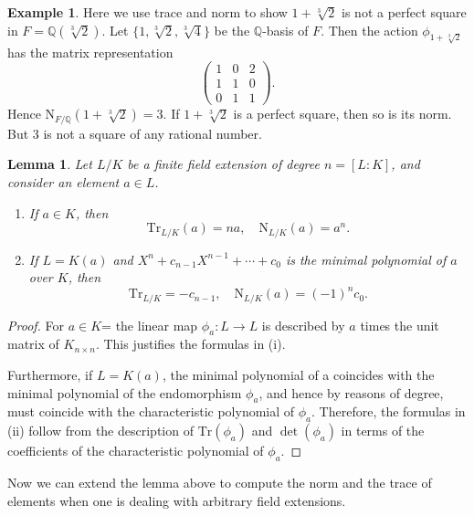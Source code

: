\documentclass[12pt]{report}
\newtheorem{lemma}[theorem]{Lemma}
\theoremstyle{definition}
\newtheorem{example}[theorem]{Example}
\newcommand{\QQ}{\mathbb{Q}}
\newcommand{\Tr}{\text{Tr}}
\newcommand{\nm}{\text{N}}
\begin{document}
\begin{example}
	Here we use trace and norm to show $1+\sqrt[3]{2}$ is not a perfect square in $F=\QQ(\sqrt[3]{2})$. Let $\{1,\sqrt[3]{2},\sqrt[3]{4}\}$ be the $\QQ$-basis of $F$. Then the action $\phi_{1+\sqrt[3]{2}}$ has the matrix representation $$\begin{pmatrix}
			1 & 0 & 2 \\
			1 & 1 & 0 \\
			0 & 1 & 1
		\end{pmatrix}.$$
	Hence $\nm_{F/\QQ}(1+\sqrt[3]{2}) =  3$. If $1+\sqrt[3]{2}$ is a perfect square, then so is its norm. But 3 is not a square of any rational number.
\end{example}

\begin{lemma}
	Let $L/K$ be a finite field extension of degree $n = [L : K]$, and consider an element $a \in L$.
	\begin{enumerate}
		\item If $a \in K$, then
		      $$\Tr_{L/K}(a) = na,\quad \nm_{L/K}(a) = a^n.$$
		\item If $L = K(a)$ and $X^n + c_{n-1}X^{n-1} +\cdots + c_0$ is the minimal polynomial of $a$ over $K$, then
		      $$\Tr_{L/K}=-c_{n-1},\quad \nm_{L/K}(a)=(-1)^nc_0.$$
	\end{enumerate}
\end{lemma}

\begin{proof}
	For $a \in K$= the linear map $\phi_a : L \to L$ is described by $a$ times the unit matrix of $K_{n\times n}$. This justifies the formulas in (i).


	Furthermore, if $L = K(a)$, the minimal polynomial of a coincides with the minimal polynomial of the endomorphism $\phi_a$, and hence by reasons of degree, must coincide with the characteristic polynomial of $\phi_a$. Therefore, the formulas in (ii) follow from the description of $\Tr(\phi_a)$ and $\det(\phi_a)$ in terms of the coefficients of the characteristic polynomial of $\phi_a$.
\end{proof}


Now we can extend the lemma above to compute the norm and the trace of elements when one is dealing with arbitrary field extensions.
\end{document}

